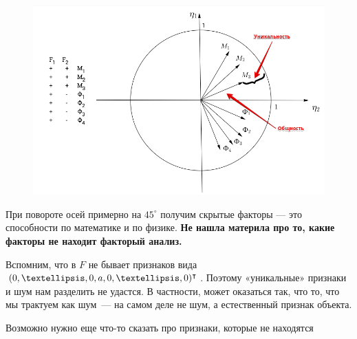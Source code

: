 \begin{ex}

	 \begin{figure}[h!]
	 	\includegraphics[scale=0.65]{img/Example.png}
	 \end{figure}
	
	
	При повороте осей примерно на $45^{\circ}$ получим скрытые факторы --- это способности по математике и по физике.
	{\bf{Не нашла материла про то, какие факторы не находит факторый анализ.}}
\end{ex}

Вспомним, что в $F$ не бывает признаков вида $\Tr{(0,…,0,a,0,…,0)}$. Поэтому «уникальные» признаки и шум нам разделить не удастся. В частности, может оказаться так, что то, что мы трактуем как шум — на самом деле не шум, а естественный признак объекта. 

{\color{red} Возможно нужно еще что-то сказать про признаки, которые не находятся }